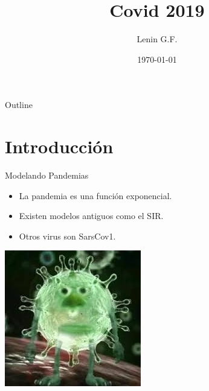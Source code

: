 \documentclass{beamer}
\title[Covid 19]{Covid 2019}
\author{Lenin G.F.}
\institute{E.P.N}
\date{\today}
\begin{document}
\begin{frame}
  \titlepage
\end{frame}

\begin{frame}{Outline}
 \tableofcontents
\end{frame}

\section{Introducción}
\begin{frame}{Modelando Pandemias}
    \begin{itemize}
        \item<1-> La pandemia es una función exponencial.
        \item<2-> Existen modelos antiguos como el SIR.
        \item<3-> Otros virus son SarsCov1. 
    \end{itemize}
\end{frame}
\usebackgroundtemplate%
{%
    \includegraphics[width=\paperwidth,height=\paperheight]{figuras/covid.jpeg}%
}
\end{document}

